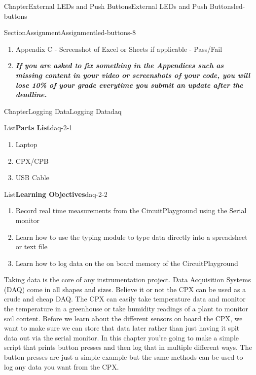 \documentclass[oneside,10pt,]{book}
\newcommand{\alert}[1]{\textbf{\textit{#1}}}
\numberwithin{equation}{section}
\begin{document}
\begin{chapterptx}{Chapter}{External LEDs and Push Buttons}{}{External LEDs and Push Buttons}{}{}{led-buttons}
\begin{sectionptx}{Section}{Assignment}{}{Assignment}{}{}{led-buttons-8}
\begin{introduction}{}
\begin{enumerate}
\item{}Appendix C - Screenshot of Excel or Sheets if applicable - Pass\slash{}Fail%
\item{}\alert{If you are asked to fix something in the Appendices such as missing content in your video or screenshots of your code, you will lose 10\% of your grade everytime you submit an update after the deadline.}%
\end{enumerate}
\end{introduction}%
\end{sectionptx}
\end{chapterptx}
%
%
\typeout{************************************************}
\typeout{************************************************}
%
\begin{chapterptx}{Chapter}{Logging Data}{}{Logging Data}{}{}{daq}
\renewcommand*{\chaptername}{Chapter}
\begin{introduction}{}%
\begin{listptx}{List}{\textbf{Parts List}}{daq-2-1}{}%
%
\begin{enumerate}
\item{}Laptop%
\item{}CPX\slash{}CPB%
\item{}USB Cable%
\end{enumerate}
\end{listptx}%
\begin{listptx}{List}{\textbf{Learning Objectives}}{daq-2-2}{}%
%
\begin{enumerate}
\item{}Record real time measurements from the CircuitPlayground using the Serial monitor%
\item{}Learn how to use the typing module to type data directly into a spreadsheet or text file%
\item{}Learn how to log data on the on board memory of the CircuitPlayground%
\end{enumerate}
\end{listptx}%
Taking data is the core of any instrumentation project. Data Acquisition Systems (DAQ) come in all shapes and sizes. Believe it or not the CPX can be used as a crude and cheap DAQ. The CPX can easily take temperature data and monitor the temperature in a greenhouse or take humidity readings of a plant to monitor soil content. Before we learn about the different sensors on board the CPX, we want to make sure we can store that data later rather than just having it spit data out via the serial monitor. In this chapter you're going to make a simple script that prints button presses and then log that in multiple different ways. The button presses are just a simple example but the same methods can be used to log any data you want from the CPX.%

\end{introduction}
\end{chapterptx}
\end{document}
